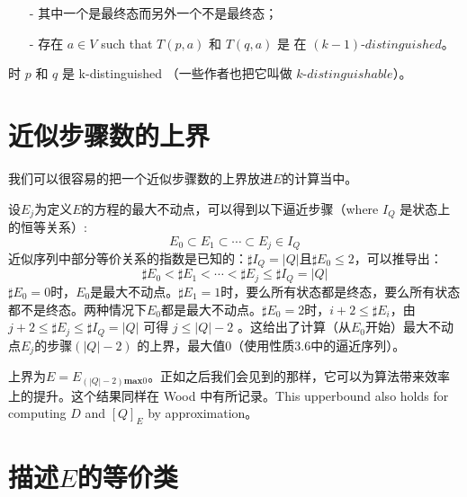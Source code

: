 
\begin{itemize}
    \item [-] 其中一个是最终态而另外一个不是最终态；
    \item [-] 存在 $a\in V$ such that $T(p,a)$ 和 $T(q,a)$ 是 在 $(k-1)$-$distinguished$。
\end{itemize}
时 $p$ 和 $q$ 是 k-distinguished （一些作者也把它叫做 $k$-$distinguishable$）。



\section{近似步骤数的上界}
我们可以很容易的把一个近似步骤数的上界放进$E$的计算当中。

设$E_j$为定义$E$的方程的最大不动点，可以得到以下逼近步骤（where $I_Q$ 是状态上的恒等关系）:
$$ E_0 \subset E_1 \subset \cdots \subset E_j \in I_Q $$
近似序列中部分等价关系的指数是已知的：$\sharp I_Q = |Q| \mbox{且} \sharp E_0 \leq 2$，可以推导出：
$$ \sharp E_0 < \sharp E_1 < \cdots < \sharp E_j \leq \sharp I_Q = |Q| $$
$\sharp E_0=0$时，$E_0$是最大不动点。$\sharp E_1=1$时，要么所有状态都是终态，要么所有状态都不是终态。两种情况下$E_0$都是最大不动点。$\sharp E_0=2$时，$i+2 \leq \sharp E_i$，由 $ j+2 \leq \sharp E_j \leq \sharp I_Q = |Q| $ 可得 $j \leq |Q|-2 $ 。这给出了计算（从$E_0$开始）最大不动点$E_j$的步骤$(|Q|-2)$ 的上界，最大值0（使用性质3.6中的逼近序列）。

上界为$E=E_{(|Q|-2)\textbf{max} 0}$。正如之后我们会见到的那样，它可以为算法带来效率上的提升。这个结果同样在 Wood \cite[引理  2.4.1]{Wood87} 中有所记录。This upperbound also holds for computing $D$ and $[Q]_E$ by approximation。


\section{描述$E$的等价类}

